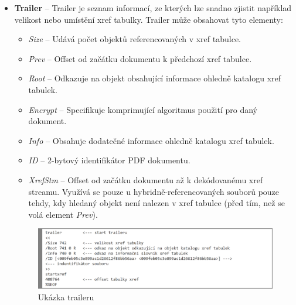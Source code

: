 \begin{itemize}
	\item \textbf{Trailer} --  Trailer je seznam informací, ze kterých lze snadno zjistit například velikost nebo umístění xref tabulky. Trailer může obsahovat tyto elementy:
	\begin{itemize}
		\item \textit{Size} -- Udává počet objektů referencovaných v xref tabulce. 
		\item \textit{Prev} -- Offset od začátku dokumentu k předchozí xref tabulce.
		\item \textit{Root} -- Odkazuje na objekt obsahující informace ohledně katalogu xref tabulek.
		\item \textit{Encrypt} -- Specifikuje komprimující algoritmus použití pro daný dokument.
		\item \textit{Info} -- Obsahuje dodatečné informace ohledně katalogu xref tabulek.
		\item \textit{ID} -- 2-bytový identifikátor PDF dokumentu.
		\item \textit{XrefStm} -- Offset od začátku dokumentu až k dekódovanému xref streamu. Využívá se pouze u hybridně-referencovaných souborů pouze tehdy, kdy hledaný objekt není nalezen v xref tabulce (před tím, než se volá element \textit{Prev}). 
	\end{itemize}
	\begin{figure}[h!]
	\centering
	\includegraphics[width=15cm]{img/pdf_trailer}
	\caption{Ukázka traileru}
	\label{fig:pdf_trailer}
	\end{figure}
\end{itemize}
